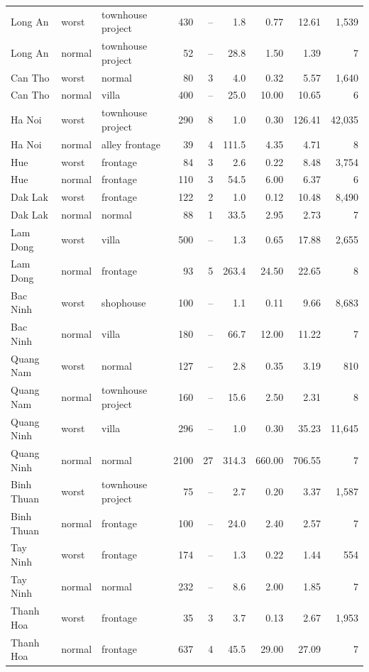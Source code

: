 {\begin{longtable}{lllrrrrrr}
Long An & worst & townhouse project & 430 & -- & 1.8 & 0.77 & 12.61 & 1,539 \\
Long An & normal & townhouse project & 52 & -- & 28.8 & 1.50 & 1.39 & 7 \\
Can Tho & worst & normal & 80 & 3 & 4.0 & 0.32 & 5.57 & 1,640 \\
Can Tho & normal & villa & 400 & -- & 25.0 & 10.00 & 10.65 & 6 \\
Ha Noi & worst & townhouse project & 290 & 8 & 1.0 & 0.30 & 126.41 & 42,035 \\
Ha Noi & normal & alley frontage & 39 & 4 & 111.5 & 4.35 & 4.71 & 8 \\
Hue & worst & frontage & 84 & 3 & 2.6 & 0.22 & 8.48 & 3,754 \\
Hue & normal & frontage & 110 & 3 & 54.5 & 6.00 & 6.37 & 6 \\
Dak Lak & worst & frontage & 122 & 2 & 1.0 & 0.12 & 10.48 & 8,490 \\
Dak Lak & normal & normal & 88 & 1 & 33.5 & 2.95 & 2.73 & 7 \\
Lam Dong & worst & villa & 500 & -- & 1.3 & 0.65 & 17.88 & 2,655 \\
Lam Dong & normal & frontage & 93 & 5 & 263.4 & 24.50 & 22.65 & 8 \\
Bac Ninh & worst & shophouse & 100 & -- & 1.1 & 0.11 & 9.66 & 8,683 \\
Bac Ninh & normal & villa & 180 & -- & 66.7 & 12.00 & 11.22 & 7 \\
Quang Nam & worst & normal & 127 & -- & 2.8 & 0.35 & 3.19 & 810 \\
Quang Nam & normal & townhouse project & 160 & -- & 15.6 & 2.50 & 2.31 & 8 \\
Quang Ninh & worst & villa & 296 & -- & 1.0 & 0.30 & 35.23 & 11,645 \\
Quang Ninh & normal & normal & 2100 & 27 & 314.3 & 660.00 & 706.55 & 7 \\
Binh Thuan & worst & townhouse project & 75 & -- & 2.7 & 0.20 & 3.37 & 1,587 \\
Binh Thuan & normal & frontage & 100 & -- & 24.0 & 2.40 & 2.57 & 7 \\
Tay Ninh & worst & frontage & 174 & -- & 1.3 & 0.22 & 1.44 & 554 \\
Tay Ninh & normal & normal & 232 & -- & 8.6 & 2.00 & 1.85 & 7 \\
Thanh Hoa & worst & frontage & 35 & 3 & 3.7 & 0.13 & 2.67 & 1,953 \\
Thanh Hoa & normal & frontage & 637 & 4 & 45.5 & 29.00 & 27.09 & 7 \\

\end{longtable}}
